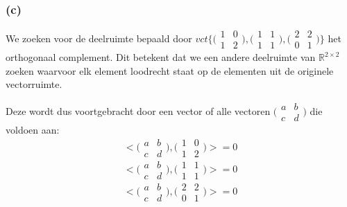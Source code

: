 \documentclass[lineaire_algebra_oplossingen.tex]{subfiles}
\begin{document}
\subsubsection*{(c)}
We zoeken voor de deelruimte bepaald door $vct\{\bigl(\begin{smallmatrix}
1 & 0 \\
1 & 2
\end{smallmatrix}\bigr),\bigl(\begin{smallmatrix}
1 & 1 \\
1 & 1
\end{smallmatrix}\bigr),\bigl(\begin{smallmatrix}
2 & 2 \\
0 & 1
\end{smallmatrix}\bigr)\}$  het orthogonaal complement. Dit betekent dat we een andere deelruimte van $\mathbb{R}^{2\times2}$ zoeken waarvoor elk element loodrecht staat op de elementen uit de originele vectorruimte.

Deze wordt dus voortgebracht door een vector of alle vectoren $\bigl(\begin{smallmatrix}
a & b \\
c & d
\end{smallmatrix}\bigr)$ die voldoen aan:
\[ <\bigl(\begin{smallmatrix}
a & b \\
c & d
\end{smallmatrix}\bigr),\bigl(\begin{smallmatrix}
1 & 0 \\
1 & 2
\end{smallmatrix}\bigr)> = 0\]
\[ <\bigl(\begin{smallmatrix}
a & b \\
c & d
\end{smallmatrix}\bigr),\bigl(\begin{smallmatrix}
1 & 1 \\
1 & 1
\end{smallmatrix}\bigr)> = 0\]
\[ <\bigl(\begin{smallmatrix}
a & b \\
c & d
\end{smallmatrix}\bigr),\bigl(\begin{smallmatrix}
2 & 2 \\
0 & 1
\end{smallmatrix}\bigr)> = 0\]
\end{document}
